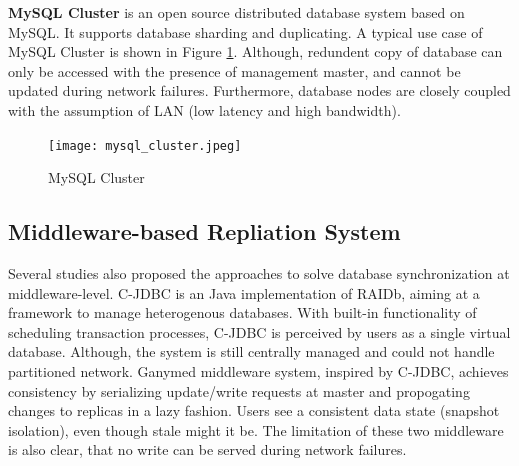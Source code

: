 \textbf{MySQL Cluster}\cite{mysqlcluster} is an open source distributed database system based on MySQL. It supports database sharding and duplicating. A typical use case of MySQL Cluster is shown in Figure \ref{mysql_cluster}. Although, redundent copy of database can only be accessed with the presence of management master, and cannot be updated during network failures. Furthermore, database nodes are closely coupled with the assumption of LAN (low latency and high bandwidth).

\begin{figure}[htbp]
\centering
\texttt{[image: mysql\_cluster.jpeg]}
\caption{MySQL Cluster}
\label{mysql_cluster}
\end{figure}

\subsection{Middleware-based Repliation System}
Several studies also proposed the approaches to solve database synchronization at middleware-level\cite{cecchetc}\cite{amza2003conflict}\cite{plattner2004ganymed}. C-JDBC \cite{cecchetc} is an Java implementation of RAIDb\cite{cecchet2005raidb}, aiming at a framework to manage heterogenous databases. With built-in functionality of scheduling transaction processes, C-JDBC is perceived by users as a single virtual database. Although, the system is still centrally managed and could not handle partitioned network. Ganymed middleware system\cite{plattner2004ganymed}, inspired by C-JDBC, achieves consistency by serializing update/write requests at master and propogating changes to replicas in a lazy fashion. Users see a consistent data state (snapshot isolation), even though stale might it be. The limitation of these two middleware is also clear, that no write can be served during network failures.


